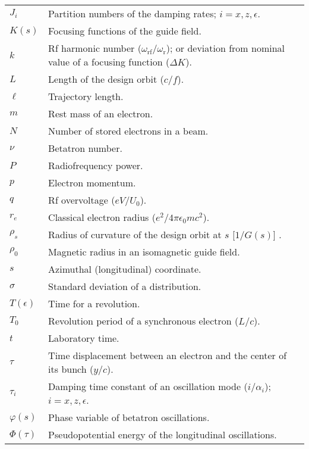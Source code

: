 \begin{tabularx}{\linewidth}{@{}lX@{}}
	$J_i$		& Partition numbers of the damping rates; $i = x, z, \epsilon$.\\
    $K(s)$		& Focusing functions of the guide field.\\
	$k$			& Rf harmonic number ($\omega_\text{rf}/\omega_\text{r}$); or deviation from nominal value of a focusing function ($\Delta K$).\\
    $L$			& Length of the design orbit ($c/f$).\\
    $\ell$		& Trajectory length.\\
    $m$			& Rest mass of an electron.\\
    $N$			& Number of stored electrons in a beam.\\
	$\nu$		& Betatron number.\\
	$P$			& Radiofrequency power.\\
    $p$			& Electron momentum.\\
	$q$			& Rf overvoltage ($eV/U_0$).\\
	$r_e$		& Classical electron radius ($e^2/4\pi\epsilon_0 m c^2$).\\
    $\rho_s$	& Radius of curvature of the design orbit at $s$ [$1/G(s)$] .\\
    $\rho_0$	& Magnetic radius in an isomagnetic guide field.\\
	$s$			& Azimuthal (longitudinal) coordinate.\\
    $\sigma$	& Standard deviation of a distribution.\\
	$T(\epsilon)$ & Time for a revolution.\\
	$T_0$		& Revolution period of a synchronous electron ($L/c$).\\
	$t$			& Laboratory time.\\
	$\tau$		& Time displacement between an electron and the center of its bunch ($y/c$).\\
	$\tau_i$	& Damping time constant of an oscillation mode ($i/\alpha_i$); $i = x,z,\epsilon$.\\
	$\varphi(s)$ & Phase variable of betatron oscillations.\\
	$\Phi(\tau)$		&  Pseudopotential energy of the longitudinal oscillations.\\

\end{tabularx}
